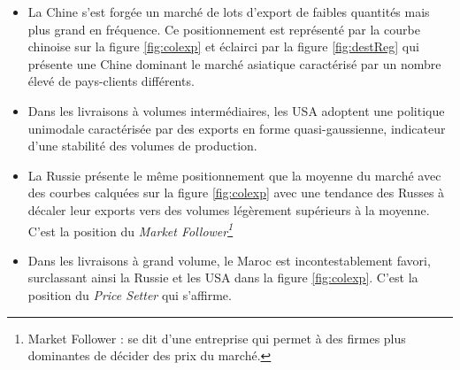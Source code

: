 			\begin{itemize}
		\item La Chine s'est forgée un marché de lots d'export de faibles quantités mais plus grand en fréquence. Ce positionnement est représenté par la courbe chinoise sur la figure \ref{fig:colexp} et éclairci par la figure \ref{fig:destReg} qui présente une Chine dominant le marché asiatique caractérisé par un nombre élevé de pays-clients différents.
		\item Dans les livraisons à volumes intermédiaires, les USA adoptent une politique unimodale caractérisée par des exports en forme quasi-gaussienne, indicateur d'une stabilité des volumes de production.
		\item La Russie présente le même positionnement que la moyenne du marché avec des courbes calquées sur la figure \ref{fig:colexp} avec une tendance des Russes à décaler leur exports vers des volumes légèrement supérieurs à la moyenne. C'est la position du \textit{Market Follower\footnote{Market Follower : se dit d'une entreprise qui permet à des firmes plus dominantes de décider des prix du marché.}}
		\item Dans les livraisons à grand volume, le Maroc est incontestablement favori, surclassant ainsi la Russie et les USA dans la figure \ref{fig:colexp}. C'est la position du \textit{Price Setter} qui s'affirme.
			\end{itemize}
